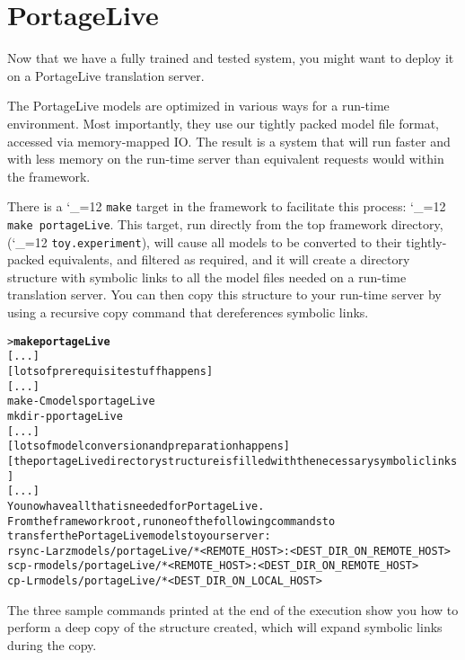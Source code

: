 \documentclass[11pt,letterpaper]{article}
\def\code{\begingroup\catcode`\_=12 \codex}
\newcommand{\codex}[1]{\texttt{#1}\endgroup}
\begin{document}
\section{PortageLive} \label{PLive}

Now that we have a fully trained and tested system, you might want to deploy it
on a PortageLive translation server.

The PortageLive models are optimized in various ways for a run-time
environment.  Most importantly, they use our tightly packed model file format,
accessed via memory-mapped IO.
The result is a system that will run faster and with less memory on the
run-time server than equivalent requests would within the framework.

There is a \code{make} target in the framework to facilitate this process:
\code{make portageLive}.  This target, run directly from the top framework
directory, (\code{toy.experiment}), will cause all models to be converted to
their tightly-packed equivalents, and
filtered as required, and it will create a directory structure with symbolic
links to all the model files needed on a run-time translation server.  You can
then copy this structure to your run-time server by using a recursive copy
command that dereferences symbolic links.

\begin{small}
\begin{alltt}
   > \textbf{make portageLive}
   [...]
   [lots of prerequisite stuff happens]
   [...]
   make -C models portageLive
   mkdir -p portageLive
   [...]
   [lots of model conversion and preparation happens]
   [the portageLive directory structure is filled with the necessary symbolic links]
   [...]
   You now have all that is needed for PortageLive.
   From the framework root, run one of the following commands to
   transfer the PortageLive models to your server:
   rsync -Larz models/portageLive/* <REMOTE_HOST>:<DEST_DIR_ON_REMOTE_HOST>
   scp -r models/portageLive/* <REMOTE_HOST>:<DEST_DIR_ON_REMOTE_HOST>
   cp -Lr models/portageLive/* <DEST_DIR_ON_LOCAL_HOST>
\end{alltt}
\end{small}

The three sample commands printed at the end of the execution show you how to
perform a deep copy of the structure created, which will expand symbolic links
during the copy.
\end{document}
